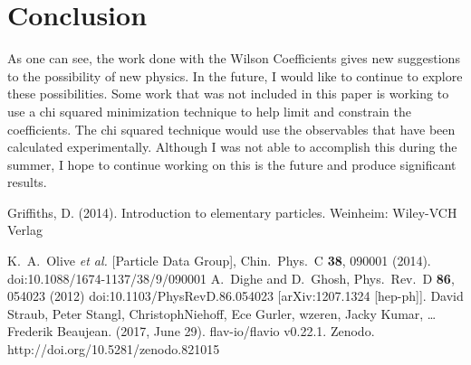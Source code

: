 \documentclass[12pt]{article}
\begin{document}
\section{Conclusion}
As one can see, the work done with the Wilson Coefficients gives new suggestions to the possibility of new physics. In the future, I would like to continue to explore these possibilities. Some work that was not included in this paper is working to use a chi squared minimization technique to help limit and constrain the coefficients. The chi squared technique would use the observables that have been calculated experimentally. Although I was not able to accomplish this during the summer, I hope to continue working on this is the future and produce significant results.
\newpage
\begin{thebibliography}{9}
Griffiths, D. (2014). Introduction to elementary particles. Weinheim: Wiley-VCH Verlag

  K.~A.~Olive {\it et al.} [Particle Data Group],
  Chin.\ Phys.\ C {\bf 38}, 090001 (2014).
  doi:10.1088/1674-1137/38/9/090001
  A.~Dighe and D.~Ghosh,
  Phys.\ Rev.\ D {\bf 86}, 054023 (2012)
  doi:10.1103/PhysRevD.86.054023
  [arXiv:1207.1324 [hep-ph]].
    David Straub, Peter Stangl, ChristophNiehoff, Ece Gurler, wzeren, Jacky Kumar, … Frederik Beaujean. (2017, June 29). flav-io/flavio v0.22.1. Zenodo. http://doi.org/10.5281/zenodo.821015
\end{thebibliography}
\newpage
\end{document}
